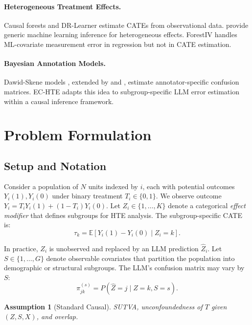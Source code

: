 \documentclass[11pt,a4paper]{article}
\newtheorem{assumption}{Assumption}
\newcommand{\E}{\mathbb{E}}
\begin{document}
\paragraph{Heterogeneous Treatment Effects.}
Causal forests \citep{wager2018,athey2019} and DR-Learner \citep{kennedy2023} estimate CATEs from observational data.
\citet{chernozhukov2018} provide generic machine learning inference for heterogeneous effects.
ForestIV \citep{bu2023} handles ML-covariate measurement error in regression but not in CATE estimation.

\paragraph{Bayesian Annotation Models.}
Dawid-Skene models \citep{dawid1979}, extended by \citet{passonneau2014} and \citet{hovy2013}, estimate annotator-specific confusion matrices.
EC-HTE adapts this idea to subgroup-specific LLM error estimation within a causal inference framework.

\section{Problem Formulation}

\subsection{Setup and Notation}

Consider a population of $N$ units indexed by $i$, each with potential outcomes $Y_i(1), Y_i(0)$ under binary treatment $T_i \in \{0,1\}$.
We observe outcome $Y_i = T_i Y_i(1) + (1-T_i) Y_i(0)$.
Let $Z_i \in \{1, \ldots, K\}$ denote a categorical \emph{effect modifier} that defines subgroups for HTE analysis.
The subgroup-specific CATE is:
\begin{equation}
\tau_k = \E[Y_i(1) - Y_i(0) \mid Z_i = k].
\end{equation}

In practice, $Z_i$ is unobserved and replaced by an LLM prediction $\hat{Z}_i$.
Let $S \in \{1, \ldots, G\}$ denote observable covariates that partition the population into demographic or structural subgroups.
The LLM's confusion matrix may vary by $S$:
\begin{equation}
\pi_{jk}^{(s)} = P(\hat{Z} = j \mid Z = k, S = s).
\end{equation}

\begin{assumption}[Standard Causal]\label{a:causal}
SUTVA, unconfoundedness of $T$ given $(Z, S, X)$, and overlap.
\end{assumption}
\end{document}
